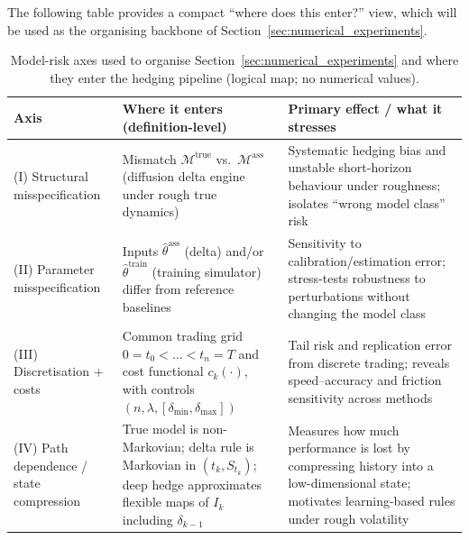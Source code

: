 \documentclass[12pt,a4paper]{article}
\theoremstyle{definition}
\theoremstyle{plain}
\theoremstyle{remark}
\theoremstyle{plain}
\begin{document}
\medskip

\noindent
The following table provides a compact ``where does this enter?'' view, which will be used as the organising backbone of Section~\ref{sec:numerical_experiments}.

\begin{table}[H]
\centering
\caption{Model-risk axes used to organise Section~\ref{sec:numerical_experiments} and where they enter the hedging pipeline (logical map; no numerical values).}
\label{tab:model_risk_axes_map}
\renewcommand{\arraystretch}{1.15}
\begin{tabular}{p{3.4cm} p{6.2cm} p{5.2cm}}
\toprule
\textbf{Axis} & \textbf{Where it enters (definition-level)} & \textbf{Primary effect / what it stresses} \\
\midrule
(I) Structural misspecification &
Mismatch $\mathcal{M}^{\mathrm{true}}$ vs.\ $\mathcal{M}^{\mathrm{ass}}$ (diffusion delta engine under rough true dynamics) \cite{GatheralRough,BayerFriz2016,BlackScholes1973,Heston1993}
&
Systematic hedging bias and unstable short-horizon behaviour under roughness; isolates ``wrong model class'' risk \cite{GatheralRough,BayerFriz2016} \\
\addlinespace
(II) Parameter misspecification &
Inputs $\hat\theta^{\mathrm{ass}}$ (delta) and/or $\hat\theta^{\mathrm{train}}$ (training simulator) differ from reference baselines \cite{ElKaroui1998Robustness,Buehler2019DeepHedging,Horvath2021DeepRough}
&
Sensitivity to calibration/estimation error; stress-tests robustness to perturbations without changing the model class \cite{ElKaroui1998Robustness} \\
\addlinespace
(III) Discretisation + costs &
Common trading grid $0=t_0<\dots<t_n=T$ and cost functional $c_k(\cdot)$, with controls $(n,\lambda,[\delta_{\min},\delta_{\max}])$ \cite{Buehler2019DeepHedging,FoellmerSchied2016,WhalleyWilmott2002}
&
Tail risk and replication error from discrete trading; reveals speed--accuracy and friction sensitivity across methods \cite{FoellmerSchied2016,Buehler2019DeepHedging} \\
\addlinespace
(IV) Path dependence / state compression &
True model is non-Markovian; delta rule is Markovian in $(t_k,S_{t_k})$; deep hedge approximates flexible maps of $I_k$ including $\delta_{k-1}$ \cite{GatheralRough,BayerFriz2016,Buehler2019DeepHedging,Horvath2021DeepRough}
&
Measures how much performance is lost by compressing history into a low-dimensional state; motivates learning-based rules under rough volatility \cite{GatheralRough,Horvath2021DeepRough} \\
\bottomrule
\end{tabular}
\end{table}
\end{document}
